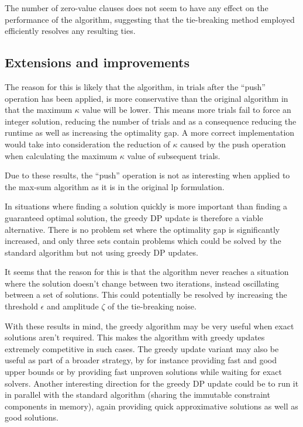 The number of zero-value clauses does not seem to have any effect on the performance of the algorithm, suggesting that the tie-breaking method employed efficiently resolves any resulting ties.



\subsection{Extensions and improvements}




The reason for this is likely that the algorithm, in trials after the \enquote{push} operation has been applied, is more conservative than the original algorithm in that the maximum \(\kappa\) value will be lower. This means more trials fail to force an integer solution, reducing the number of trials and as a consequence reducing the runtime as well as increasing the optimality gap.
A more correct implementation would take into consideration the reduction of \(\kappa\) caused by the push operation when calculating the maximum \(\kappa\) value of subsequent trials.

Due to these results, the \enquote{push} operation is not as interesting when applied to the max-sum algorithm as it is in the original \gls{lp} formulation.



In situations where finding a solution quickly is more important than finding a guaranteed optimal solution, the greedy DP update is therefore a viable alternative.
There is no problem set where the optimality gap is significantly increased, and only three sets contain problems which could be solved by the standard algorithm but not using greedy DP updates.


It seems that the reason for this is that the algorithm never reaches a situation where the solution doesn't change between two iterations, instead oscillating between a set of solutions.
This could potentially be resolved by increasing the threshold \(\epsilon\) and amplitude \(\zeta\) of the tie-breaking noise.

With these results in mind, the greedy algorithm may be very useful when exact solutions aren't required.
This makes the algorithm with greedy updates extremely competitive in such cases.
The greedy update variant may also be useful as part of a broader strategy, by for instance providing fast and good upper bounds or by providing fast unproven solutions while waiting for exact solvers.
Another interesting direction for the greedy DP update could be to run it in parallel with the standard algorithm (sharing the immutable constraint components in memory), again providing quick approximative solutions as well as good solutions.

